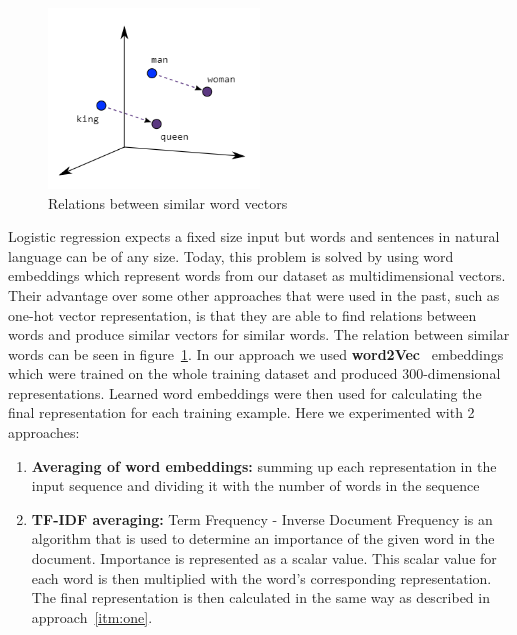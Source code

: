 \documentclass[10pt, a4paper]{article}
\begin{document}
\begin{figure}[h]
    \centering
    \includegraphics[width=0.5\textwidth]{images/embeddings}
    \caption{Relations between similar word vectors}
    \label{fig:embedding}
\end{figure}
\hfill \break
\hfill \break
\hfill \break
Logistic regression expects a fixed size input but words and sentences in natural language can be of any size.
Today, this problem is solved by using word embeddings which represent words from our dataset as multidimensional vectors.
Their advantage over some other approaches that were used in the past, such as one-hot vector representation, is that they are able to find relations between words and produce similar vectors for similar words.
The relation between similar words can be seen in figure~\ref{fig:embedding}.
In our approach we used \textbf{word2Vec}~\citep{mikolov2013efficient} embeddings which were trained on the whole training dataset and produced 300-dimensional representations.
Learned word embeddings were then used for calculating the final representation for each training example.
Here we experimented with 2 approaches:
\begin{enumerate}
    \item \label{itm:one} \textbf{Averaging of word embeddings:} summing up each representation in the input sequence and dividing it with the number of words in the sequence
    \item \textbf{TF-IDF averaging:} Term Frequency - Inverse Document Frequency is an algorithm that is used to determine an importance of the given word in the document.
    Importance is represented as a scalar value.
     This scalar value for each word is then multiplied with the word's corresponding representation.
    The final representation is then calculated in the same way as described in approach~\ref{itm:one}.

\end{enumerate}
\end{document}
